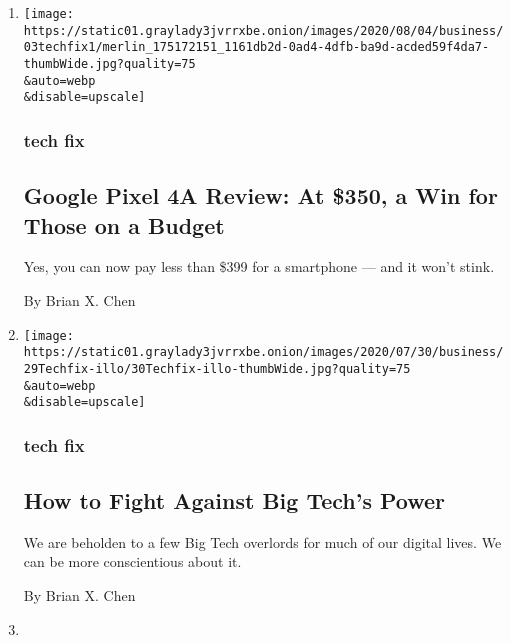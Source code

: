 \begin{enumerate}
\def\labelenumi{\arabic{enumi}.}
\item
  \href{/2020/08/03/technology/personaltech/google-pixel-4a-review.html}{}

  \texttt{[image: https://static01.graylady3jvrrxbe.onion/images/2020/08/04/business/03techfix1/merlin\_175172151\_1161db2d-0ad4-4dfb-ba9d-acded59f4da7-thumbWide.jpg?quality=75\\\&auto=webp\\\&disable=upscale]}

  \hypertarget{tech-fix}{%
  \subsubsection{tech fix}\label{tech-fix}}

  \hypertarget{google-pixel-4a-review-at-350-a-win-for-those-on-a-budget}{%
  \subsection{Google Pixel 4A Review: At \$350, a Win for Those on a
  Budget}\label{google-pixel-4a-review-at-350-a-win-for-those-on-a-budget}}

  Yes, you can now pay less than \$399 for a smartphone --- and it won't
  stink.

  By Brian X. Chen
\item
  \href{/2020/07/29/technology/personaltech/big-tech-power-how-to-fight.html}{}

  \texttt{[image: https://static01.graylady3jvrrxbe.onion/images/2020/07/30/business/29Techfix-illo/30Techfix-illo-thumbWide.jpg?quality=75\\\&auto=webp\\\&disable=upscale]}

  \hypertarget{tech-fix-1}{%
  \subsubsection{tech fix}\label{tech-fix-1}}

  \hypertarget{how-to-fight-against-big-techs-power}{%
  \subsection{How to Fight Against Big Tech's
  Power}\label{how-to-fight-against-big-techs-power}}

  We are beholden to a few Big Tech overlords for much of our digital
  lives. We can be more conscientious about it.

  By Brian X. Chen
\item
  \href{/es/2020/07/22/espanol/negocios/doomscrolling-que-es.html}{}


\end{enumerate}
